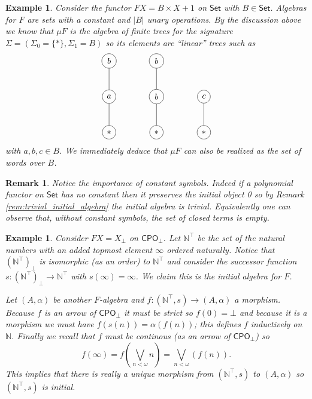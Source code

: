\documentclass[letterpaper, 11pt, oneside]{memoir}
\theoremstyle{myteo}
\newtheorem{example}[theorem]{Example}
\newtheorem{remark}[theorem]{Remark}
\numberwithin{equation}{section}
\newcommand{\Set}{\textsf{Set}}
\newcommand{\CPO}{\textsf{CPO}}
\newcommand{\N}{\mathbb{N}}
\begin{document}
\begin{example}
  Consider the functor \(FX = B \times X + 1\) on \(\Set\) with \(B \in \Set\).
  Algebras for \(F\) are sets with a constant and \(|B|\) unary operations.
  By the discussion above we know that \(\mu F\) is the algebra of finite trees for the signature \(\Sigma = (\Sigma_0 = \{*\}, \Sigma_1 = B)\) so its elements are ``linear'' trees such as
  \begin{equation*}
    \begin{tikzpicture}
      \path
      (0,0) node[circle, draw](x){\(*\)}
      (0,1.5) node[circle, draw](y){\(a\)}
      (0,3) node[circle, draw](z){\(b\)};
      \draw (x) -- (y) -- (z);

      \path
      (2, 0) node[circle, draw](x){\(*\)}
      (2, 1.5) node[circle, draw](y){\(b\)}
      (2, 3) node[circle, draw](z){\(b\)};
      \draw (x) -- (y) -- (z);

      \path
      (4, 0) node[circle, draw](x){\(*\)}
      (4, 1.5) node[circle, draw](y){\(c\)};
      \draw (x) -- (y);
    \end{tikzpicture}
  \end{equation*}
  with \(a, b, c \in B\).
  We immediately deduce that \(\mu F\) can also be realized as the set of words over \(B\).
\end{example}

\begin{remark}
  Notice the importance of constant symbols.
  Indeed if a polynomial functor on \(\Set\) has no constant then it preserves the initial object 0 so by Remark \ref{rem:trivial_initial_algebra} the initial algebra is trivial.
 Equivalently one can observe that, without constant symbols, the set of closed terms is empty.
\end{remark}

\begin{example}
  Consider \(FX = X_\bot\) on \(\CPO_\bot\).
  Let \(\mathbb{N}^\top\) be the set of the natural numbers with an added topmost element \(\infty\) ordered naturally.
  Notice that \((\mathbb{N}^\top)_\bot\) is isomorphic (as an order) to \(\mathbb{N}^\top\) and consider the successor function \(s \colon (\mathbb{N}^\top)_\bot \to \mathbb{N}^\top\) with \(s(\infty) = \infty\).
  We claim this is the initial algebra for \(F\).

  Let \((A, \alpha)\) be another \(F\)-algebra and \(f \colon (\N^\top, s) \to (A, \alpha)\) a morphism.
  Because \(f\) is an arrow of \(\CPO_\bot\) it must be strict so \(f(0) = \bot\) and because it is a morphism we must have \(f(s(n)) = \alpha(f(n))\); this defines \(f\) inductively on \(\N\).
  Finally we recall that \(f\) must be continous (as an arrow of \(\CPO_\bot\)) so
  \begin{equation*}
    f(\infty) = f \left(\bigvee_{n < \omega} n\right) = \bigvee_{n < \omega}(f(n)).
  \end{equation*}
  This implies that there is really a unique morphism from \((\N^\top, s)\) to \((A, \alpha)\) so \((\N^\top, s)\) is initial.
\end{example}
\end{document}
